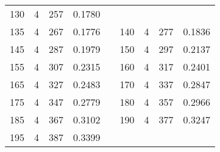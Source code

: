 \documentclass[a4paper, 12pt, french,oneside]{book}
\begin{document}
\begin{table}[!ht]
\begin{tabularx}{\linewidth}{|c|c|c|c|X|c|c|c|c|}
        130          & 4            & 257             & 0.1780                                                                                                           \\

        135          & 4            & 267             & 0.1776                        &  &

        140          & 4            & 277             & 0.1836                                                                                                           \\

        145          & 4            & 287             & 0.1979                        &  &

        150          & 4            & 297             & 0.2137                                                                                                           \\

        155          & 4            & 307             & 0.2315                        &  &

        160          & 4            & 317             & 0.2401                                                                                                           \\

        165          & 4            & 327             & 0.2483                        &  &

        170          & 4            & 337             & 0.2847                                                                                                           \\

        175          & 4            & 347             & 0.2779                        &  &

        180          & 4            & 357             & 0.2966                                                                                                           \\

        185          & 4            & 367             & 0.3102                        &  &

        190          & 4            & 377             & 0.3247                                                                                                           \\

        195          & 4            & 387             & 0.3399                        &  &


\end{tabularx}
\end{table}
\end{document}

